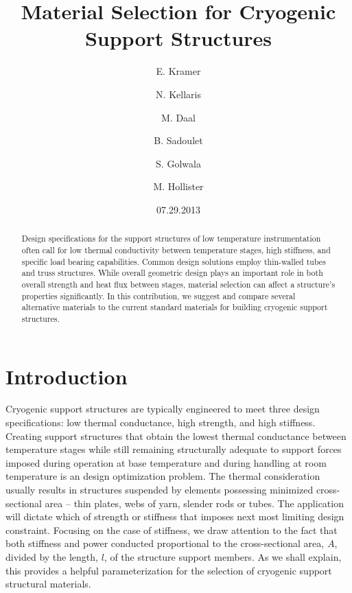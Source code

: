 \documentclass[final]{svjour2}
\begin{document}
\newcommand{\hdblarrow}{H\makebox[0.9ex][l]{$\downdownarrows$}-}
\title{Material Selection for Cryogenic Support Structures}

\author{E. Kramer \and N. Kellaris  \and M. Daal  \and B. Sadoulet \and S. Golwala \and M. Hollister}


\date{07.29.2013}

\maketitle

\begin{abstract}

Design specifications for the support structures of low temperature instrumentation often call for low thermal conductivity between temperature stages, high stiffness, and specific load bearing capabilities. Common design solutions employ thin-walled tubes and truss structures.  While overall geometric design plays an important role in both overall strength and heat flux between stages, material selection can affect a structure's properties significantly.  In this contribution, we suggest and compare several alternative materials to the current standard materials for building cryogenic support structures.

 
\end{abstract}

\section{Introduction} 
Cryogenic support structures are typically engineered to meet three design specifications: low thermal conductance, high strength, and high stiffness. Creating support structures that obtain the lowest thermal conductance between temperature stages while still remaining structurally adequate to support forces imposed during operation at base temperature and during handling at room temperature is an design optimization problem. The thermal consideration usually results in structures suspended by elements possessing minimized cross-sectional area -- thin plates, webs of yarn, slender rods or tubes. The application will dictate which of strength or stiffness that imposes next most limiting design constraint. Focusing on the case of stiffness, we draw attention to the fact that both stiffness and power conducted proportional to the cross-sectional area, $A$, divided by the length, $l$, of the structure support members.\cite{Hastings1993} As we shall explain, this provides a helpful parameterization for the selection of cryogenic support structural materials.  
\end{document}
